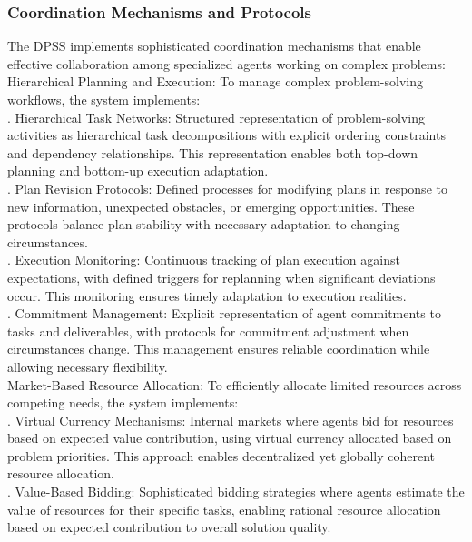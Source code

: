 \subsubsection{Coordination Mechanisms and Protocols}
The DPSS implements sophisticated coordination mechanisms that enable effective collaboration among specialized agents working on complex problems:\\ \newline
Hierarchical Planning and Execution: To manage complex problem-solving workflows, the system implements:\\ . Hierarchical Task Networks: Structured representation of problem-solving activities as hierarchical task decompositions with explicit ordering constraints and dependency relationships. This representation enables both top-down planning and bottom-up execution adaptation.\\ . Plan Revision Protocols: Defined processes for modifying plans in response to new information, unexpected obstacles, or emerging opportunities. These protocols balance plan stability with necessary adaptation to changing circumstances.\\ . Execution Monitoring: Continuous tracking of plan execution against expectations, with defined triggers for replanning when significant deviations occur. This monitoring ensures timely adaptation to execution realities.\\ . Commitment Management: Explicit representation of agent commitments to tasks and deliverables, with protocols for commitment adjustment when circumstances change. This management ensures reliable coordination while allowing necessary flexibility.\\ \newline
Market-Based Resource Allocation: To efficiently allocate limited resources across competing needs, the system implements:\\ . Virtual Currency Mechanisms: Internal markets where agents bid for resources based on expected value contribution, using virtual currency allocated based on problem priorities. This approach enables decentralized yet globally coherent resource allocation.\\ . Value-Based Bidding: Sophisticated bidding strategies where agents estimate the value of resources for their specific tasks, enabling rational resource allocation based on expected contribution to overall solution quality.\\ \newline
